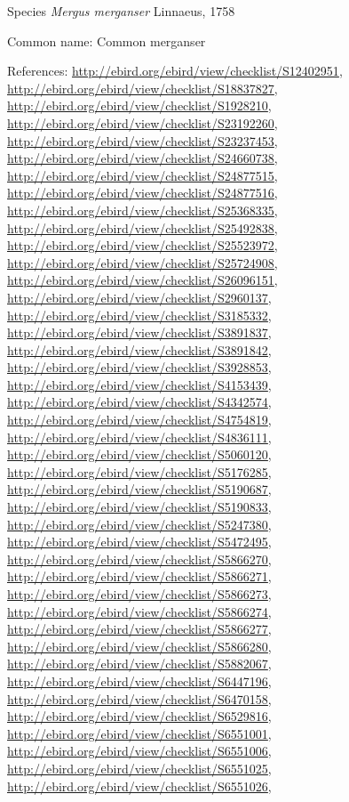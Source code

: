 \documentclass[9pt, article]{memoir}
\begin{document}
\begin{multicols}{2}
\vspace{6pt}\noindent\hspace{36pt}Species \textit{Mergus merganser} Linnaeus, 1758


Common name: Common merganser

References: 
\url{http://ebird.org/ebird/view/checklist/S12402951}, 
\url{http://ebird.org/ebird/view/checklist/S18837827}, 
\url{http://ebird.org/ebird/view/checklist/S1928210}, 
\url{http://ebird.org/ebird/view/checklist/S23192260}, 
\url{http://ebird.org/ebird/view/checklist/S23237453}, 
\url{http://ebird.org/ebird/view/checklist/S24660738}, 
\url{http://ebird.org/ebird/view/checklist/S24877515}, 
\url{http://ebird.org/ebird/view/checklist/S24877516}, 
\url{http://ebird.org/ebird/view/checklist/S25368335}, 
\url{http://ebird.org/ebird/view/checklist/S25492838}, 
\url{http://ebird.org/ebird/view/checklist/S25523972}, 
\url{http://ebird.org/ebird/view/checklist/S25724908}, 
\url{http://ebird.org/ebird/view/checklist/S26096151}, 
\url{http://ebird.org/ebird/view/checklist/S2960137}, 
\url{http://ebird.org/ebird/view/checklist/S3185332}, 
\url{http://ebird.org/ebird/view/checklist/S3891837}, 
\url{http://ebird.org/ebird/view/checklist/S3891842}, 
\url{http://ebird.org/ebird/view/checklist/S3928853}, 
\url{http://ebird.org/ebird/view/checklist/S4153439}, 
\url{http://ebird.org/ebird/view/checklist/S4342574}, 
\url{http://ebird.org/ebird/view/checklist/S4754819}, 
\url{http://ebird.org/ebird/view/checklist/S4836111}, 
\url{http://ebird.org/ebird/view/checklist/S5060120}, 
\url{http://ebird.org/ebird/view/checklist/S5176285}, 
\url{http://ebird.org/ebird/view/checklist/S5190687}, 
\url{http://ebird.org/ebird/view/checklist/S5190833}, 
\url{http://ebird.org/ebird/view/checklist/S5247380}, 
\url{http://ebird.org/ebird/view/checklist/S5472495}, 
\url{http://ebird.org/ebird/view/checklist/S5866270}, 
\url{http://ebird.org/ebird/view/checklist/S5866271}, 
\url{http://ebird.org/ebird/view/checklist/S5866273}, 
\url{http://ebird.org/ebird/view/checklist/S5866274}, 
\url{http://ebird.org/ebird/view/checklist/S5866277}, 
\url{http://ebird.org/ebird/view/checklist/S5866280}, 
\url{http://ebird.org/ebird/view/checklist/S5882067}, 
\url{http://ebird.org/ebird/view/checklist/S6447196}, 
\url{http://ebird.org/ebird/view/checklist/S6470158}, 
\url{http://ebird.org/ebird/view/checklist/S6529816}, 
\url{http://ebird.org/ebird/view/checklist/S6551001}, 
\url{http://ebird.org/ebird/view/checklist/S6551006}, 
\url{http://ebird.org/ebird/view/checklist/S6551025}, 
\url{http://ebird.org/ebird/view/checklist/S6551026}, 

\end{multicols}
\end{document}
